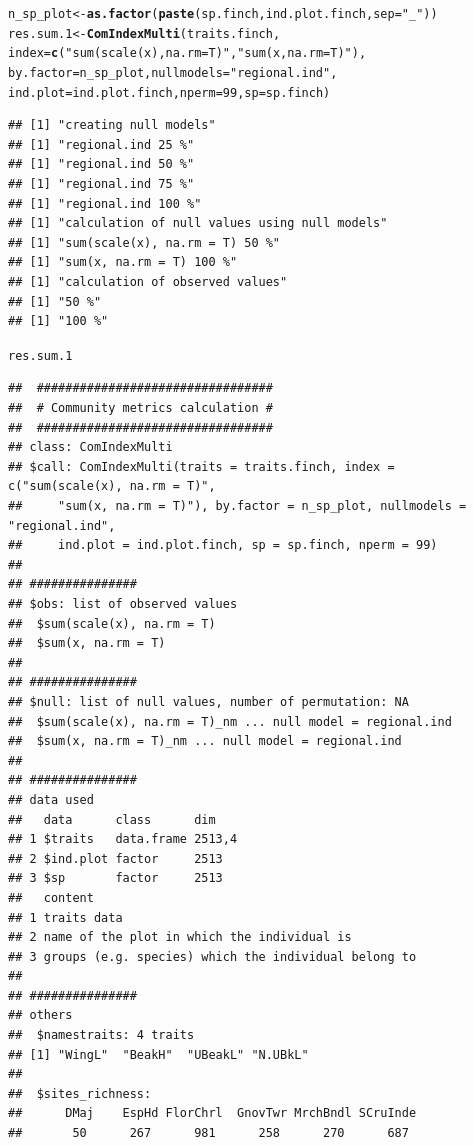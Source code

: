\documentclass[12pt]{article}\usepackage[]{graphicx}\usepackage[]{color}
\makeatletter
\newcommand{\hlnum}[1]{\textcolor[rgb]{0.686,0.059,0.569}{#1}}%
\newcommand{\hlstr}[1]{\textcolor[rgb]{0.192,0.494,0.8}{#1}}%
\newcommand{\hlstd}[1]{\textcolor[rgb]{0.345,0.345,0.345}{#1}}%
\newcommand{\hlkwb}[1]{\textcolor[rgb]{0.69,0.353,0.396}{#1}}%
\newcommand{\hlkwc}[1]{\textcolor[rgb]{0.333,0.667,0.333}{#1}}%
\newcommand{\hlkwd}[1]{\textcolor[rgb]{0.737,0.353,0.396}{\textbf{#1}}}%
\newenvironment{kframe}{%
 \def\at@end@of@kframe{}%
 \ifinner\ifhmode%
  \def\at@end@of@kframe{\end{minipage}}%
  \begin{minipage}{\columnwidth}%
 \fi\fi%
 \def\FrameCommand##1{\hskip\@totalleftmargin \hskip-\fboxsep
 \colorbox{shadecolor}{##1}\hskip-\fboxsep
     \hskip-\linewidth \hskip-\@totalleftmargin \hskip\columnwidth}%
 \MakeFramed {\advance\hsize-\width
   \@totalleftmargin\z@ \linewidth\hsize
   \@setminipage}}%
 {\par\unskip\endMakeFramed%
 \at@end@of@kframe}
\newenvironment{knitrout}{}{} %
\makeatother
\begin{document}
\begin{knitrout}
\color{fgcolor}\begin{kframe}
\begin{alltt}
\hlstd{n_sp_plot}\hlkwb{<-}\hlkwd{as.factor}\hlstd{(}\hlkwd{paste}\hlstd{(sp.finch, ind.plot.finch,} \hlkwc{sep} \hlstd{=} \hlstr{"_"}\hlstd{))}
\hlstd{res.sum.1}\hlkwb{<-}\hlkwd{ComIndexMulti}\hlstd{(traits.finch,}
              \hlkwc{index} \hlstd{=} \hlkwd{c}\hlstd{(}\hlstr{"sum(scale(x), na.rm = T)"}\hlstd{,} \hlstr{"sum(x, na.rm = T)"}\hlstd{),}
              \hlkwc{by.factor} \hlstd{= n_sp_plot,} \hlkwc{nullmodels} \hlstd{=} \hlstr{"regional.ind"}\hlstd{,}
              \hlkwc{ind.plot} \hlstd{= ind.plot.finch,} \hlkwc{nperm} \hlstd{=} \hlnum{99}\hlstd{,} \hlkwc{sp} \hlstd{= sp.finch)}
\end{alltt}
\begin{verbatim}
## [1] "creating null models"
## [1] "regional.ind 25 %"
## [1] "regional.ind 50 %"
## [1] "regional.ind 75 %"
## [1] "regional.ind 100 %"
## [1] "calculation of null values using null models"
## [1] "sum(scale(x), na.rm = T) 50 %"
## [1] "sum(x, na.rm = T) 100 %"
## [1] "calculation of observed values"
## [1] "50 %"
## [1] "100 %"
\end{verbatim}
\begin{alltt}
\hlstd{res.sum.1}
\end{alltt}
\begin{verbatim}
## 	#################################
## 	# Community metrics calculation #
## 	#################################
## class: ComIndexMulti
## $call: ComIndexMulti(traits = traits.finch, index = c("sum(scale(x), na.rm = T)", 
##     "sum(x, na.rm = T)"), by.factor = n_sp_plot, nullmodels = "regional.ind", 
##     ind.plot = ind.plot.finch, sp = sp.finch, nperm = 99)
## 
## ###############
## $obs: list of observed values
## 	$sum(scale(x), na.rm = T)
## 	$sum(x, na.rm = T)
## 
## ###############
## $null: list of null values, number of permutation: NA 
## 	$sum(scale(x), na.rm = T)_nm ... null model = regional.ind
## 	$sum(x, na.rm = T)_nm ... null model = regional.ind
## 
## ###############
## data used
##   data      class      dim   
## 1 $traits   data.frame 2513,4
## 2 $ind.plot factor     2513  
## 3 $sp       factor     2513  
##   content                                             
## 1 traits data                                         
## 2 name of the plot in which the individual is         
## 3 groups (e.g. species) which the individual belong to
## 
## ###############
## others
## 	$namestraits: 4 traits
## [1] "WingL"  "BeakH"  "UBeakL" "N.UBkL"
## 
## 	$sites_richness:
## 	    DMaj    EspHd FlorChrl  GnovTwr MrchBndl SCruInde 
##       50      267      981      258      270      687
\end{verbatim}
\end{kframe}
\end{knitrout}
\end{document}
